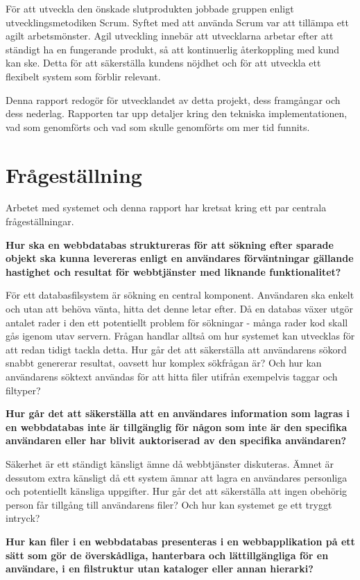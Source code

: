 \documentclass[a4paper,12pt,oneside,final]{extbook}
\begin{document}
För att utveckla den önskade slutprodukten jobbade gruppen enligt utvecklingsmetodiken Scrum. Syftet med att använda Scrum var att tillämpa ett agilt arbetsmönster. Agil utveckling innebär att utvecklarna arbetar efter att ständigt ha en fungerande produkt, så att kontinuerlig återkoppling med kund kan ske. Detta för att säkerställa kundens nöjdhet och för att utveckla ett flexibelt system som förblir relevant. \cite{softwareeng}

Denna rapport redogör för utvecklandet av detta projekt, dess framgångar och dess nederlag. Rapporten tar upp detaljer kring den tekniska implementationen, vad som genomförts och vad som skulle genomförts om mer tid funnits.

\section{Frågeställning}
Arbetet med systemet och denna rapport har kretsat kring ett par centrala frågeställningar.

\textbf{Hur ska en webbdatabas struktureras för att sökning efter sparade objekt ska kunna levereras enligt en användares förväntningar gällande hastighet och resultat för webbtjänster med liknande funktionalitet?}

För ett databasfilsystem är sökning en central komponent. Användaren ska enkelt och utan att behöva vänta, hitta det denne letar efter. Då en databas växer utgör antalet rader i den ett potentiellt problem för sökningar - många rader kod skall gås igenom utav servern. Frågan handlar alltså om hur systemet kan utvecklas för att redan tidigt tackla detta. Hur går det att säkerställa att användarens sökord snabbt genererar resultat, oavsett hur komplex sökfrågan är? Och hur kan användarens söktext användas för att hitta filer utifrån exempelvis taggar och filtyper?

\textbf{Hur går det att säkerställa att en användares information som lagras i en webbdatabas inte är tillgänglig för någon som inte är den specifika användaren eller har blivit  auktoriserad av den specifika användaren?}

Säkerhet är ett ständigt känsligt ämne då webbtjänster diskuteras. Ämnet är dessutom extra känsligt då ett system ämnar att lagra en användares personliga och potentiellt känsliga uppgifter. Hur går det att säkerställa att ingen obehörig person får tillgång till användarens filer? Och hur kan systemet ge ett tryggt intryck?

\textbf{Hur kan filer i en webbdatabas presenteras i en webbapplikation på ett sätt som gör de överskådliga, hanterbara och lättillgängliga för en användare, i en filstruktur utan kataloger eller annan hierarki?}
\end{document}
